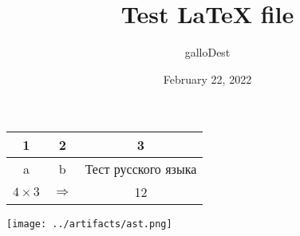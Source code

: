 \documentclass[12pt]{article}
\title{Test LaTeX file}
\author{galloDest}
\date{February 22, 2022}
\begin{document}
\maketitle

\begin{center}
	\begin{tabular} { c | c | c }
	1 & 2 & 3 \\
	\hline
	a & b & Тест русского языка \\
	\hline
	$4\times 3$ & $\Rightarrow $ & 12
	\end{tabular}
\end{center}

\begin{center}
	\texttt{[image: ../artifacts/ast.png]}\\
\end{center}
\end{document}

